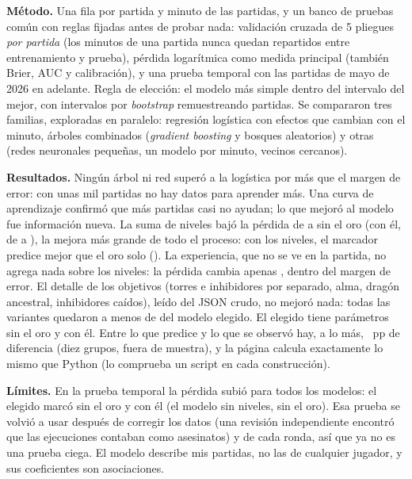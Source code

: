 \documentclass[11pt,letterpaper]{article}
\begin{document}
\noindent\textbf{Método.} Una fila por partida y minuto de las \pgPartidas{} partidas, y un
banco de pruebas común con reglas fijadas antes de probar nada: validación cruzada de 5
pliegues \emph{por partida} (los minutos de una partida nunca quedan repartidos entre
entrenamiento y prueba), pérdida logarítmica como medida principal (también Brier, AUC y
calibración), y una prueba temporal con las \pgPrueba{} partidas de mayo de 2026 en adelante.
Regla de elección: el modelo más simple dentro del intervalo del mejor, con intervalos por
\emph{bootstrap} remuestreando partidas. Se compararon tres familias, exploradas en paralelo:
regresión logística con efectos que cambian con el minuto, árboles combinados
(\emph{gradient boosting} y bosques aleatorios) y otras (redes neuronales pequeñas, un modelo
por minuto, vecinos cercanos).



\noindent\textbf{Resultados.} Ningún árbol ni red superó a la logística por más que el margen
de error: con unas mil partidas no hay datos para aprender más. Una curva de aprendizaje
confirmó que más partidas casi no ayudan; lo que mejoró al modelo fue información nueva. La
suma de niveles bajó la pérdida de \pgAntesMarc{} a \pgElegMarc{} sin el oro (con él, de
\pgAntesOro{} a \pgElegOro), la mejora más grande de todo el proceso: con los niveles, el
marcador predice mejor que el oro solo (\pgSoloOro). La experiencia, que no se ve en la
partida, no agrega nada sobre los niveles: la pérdida cambia apenas \pgXpDif, dentro del
margen de error. El detalle de los objetivos (torres e
inhibidores por separado, alma, dragón ancestral, inhibidores caídos), leído del JSON crudo,
no mejoró nada: todas las variantes quedaron a menos de \pgObjDifMax{} del modelo elegido. El
elegido tiene \pgNumMarc{} parámetros sin el oro y \pgNumOro{} con él. Entre lo que predice y
lo que se observó hay, a lo más, \pgCalMax{}~pp de diferencia (diez grupos, fuera de muestra),
y la página calcula exactamente lo mismo que Python (lo comprueba un script en cada
construcción).

\noindent\textbf{Límites.} En la prueba temporal la pérdida subió para todos los modelos:
el elegido marcó \pgPruebaMarc{} sin el oro y \pgPruebaOro{} con él (el modelo sin niveles,
\pgPruebaAntesMarc{} sin el oro). Esa prueba se volvió a usar después de corregir los datos (una
revisión independiente encontró que las ejecuciones contaban como asesinatos) y de cada ronda,
así que ya no es una prueba ciega. El modelo describe mis partidas, no las de cualquier jugador,
y sus coeficientes son asociaciones.
\end{document}
